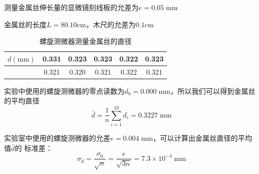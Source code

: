 \documentclass[a4paper]{ctexart}
\def\mm{\mathrm{mm}}
\def\cm{\mathrm{cm}}
\begin{document}
	\par 
	测量金属丝伸长量的显微镜刻线板的允差为$e = 0.05 \; \mm$
	\par 
	金属丝的长度$L=80.10\cm$，木尺的允差为$0.1\cm$
	\begin{table}[htbp]
		\centering
		\caption{螺旋测微器测量金属丝的直径}
		\label{diameter_1}
		\begin{tabular}{cccccc}
			\toprule[1.5pt]
			$d(\mm)$ & 0.331 & 0.323 & 0.323 & 0.322 & 0.323\\
			\midrule
			         & 0.321 & 0.320 & 0.321 & 0.322 & 0.321\\
			\bottomrule[1.5pt]
		\end{tabular}
	\end{table}
	\par 
	实验中使用的螺旋测微器的零点读数为$d_{0} = 0.000 \; \mm$，所以我们可以得到金属丝的平均直径
	$$
	\bar{d} = \frac{1}{n}\sum_{i=1}^{10}d_{i} = 0.3227 \; \mm
	$$
	\par 
	实验室中使用的螺旋测微器的允差$e = 0.004 \; \mm$，可以计算出金属丝直径的平均值$\bar{d}$的
	标准差：
	$$
	\sigma_{\bar{d}} = \frac{\sigma_{0}}{\sqrt{n}} = \frac{e}{\sqrt{3n}} = 7.3 \times 10^{-4}
	\; \mm
	$$
\end{document}
